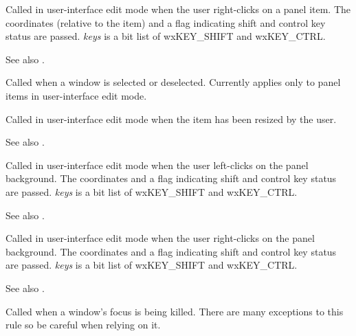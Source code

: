 Called in user-interface edit mode when the user right-clicks on a panel item.
The coordinates (relative to the item) and a flag indicating shift and control
key status are passed. {\it keys} is a bit list of wxKEY\_SHIFT and wxKEY\_CTRL.

See also .



Called when a window is selected or deselected. Currently applies only to panel items
in user-interface edit mode.



Called in user-interface edit mode when the item has been resized by the user.

See also .



Called in user-interface edit mode when the user left-clicks on the
panel background. The coordinates and a flag indicating shift and control
key status are passed. {\it keys} is a bit list of wxKEY\_SHIFT and wxKEY\_CTRL.

See also .



Called in user-interface edit mode when the user right-clicks on the
panel background. The coordinates and a flag indicating shift and control
key status are passed. {\it keys} is a bit list of wxKEY\_SHIFT and wxKEY\_CTRL.

See also .



Called when a window's focus is being killed. There are many exceptions to this rule
so be careful when relying on it.

